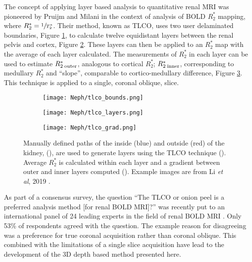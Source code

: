 The concept of applying layer based analysis to quantitative renal \ac{MRI} was pioneered by Pruijm and Milani \cite{piskunowicz_new_2015, milani_reduction_2017, pruijm_blood_2017, li_renal_2019} in the context of analysis of \ac{BOLD} $R_2^*$ mapping, where $R_2^*=\sfrac{1}{T_2^*}$. Their method, known as \ac{TLCO}, uses two user delaminated boundaries, Figure \ref{fig:ex_tlco_bounds}, to calculate twelve equidistant layers between the renal pelvis and cortex, Figure \ref{fig:ex_tlco_layers}. These layers can then be applied to an $R_2^*$ map with the average of each layer calculated. The measurements of $R_2^*$ in each layer can be used to estimate $R_{2\;\textup{outer}}^*$, analogous to cortical $R_2^*$; $R_{2\;\textup{inner}}^*$, corresponding to medullary $R_2^*$ and ``slope'', comparable to  cortico-medullary difference, Figure \ref{fig:ex_tlco_grad}. This technique is applied to a single, coronal oblique, slice.

\begin{figure}[H]
	\centering
	\begin{subfigure}[c]{0.23\textwidth}
		\centering
		\texttt{[image: Neph/tlco\_bounds.png]}
		\caption{}
		\label{fig:ex_tlco_bounds}
	\end{subfigure}
	\hfill
	\begin{subfigure}[c]{0.23\textwidth}
		\centering
		\texttt{[image: Neph/tlco\_layers.png]}
		\caption{}
		\label{fig:ex_tlco_layers}
	\end{subfigure}
	\hfill
	\begin{subfigure}[c]{0.47\textwidth}
		\centering
		\texttt{[image: Neph/tlco\_grad.png]}
		\caption{}
		\label{fig:ex_tlco_grad}
	\end{subfigure}
	\caption{Manually defined paths of the inside (blue) and outside (red) of the kidney, (), are used to generate layers using the \ac{TLCO} technique (). Average $R_2^*$ is calculated within each layer and a gradient between outer and inner layers computed (). Example images are from Li \textit{et al}, 2019 \cite{li_renal_2019}.}
	\label{fig:ex_tlco}
\end{figure}

As part of a consensus survey, the question ``The \ac{TLCO} or onion peel is a preferred analysis method [for renal \ac{BOLD} \ac{MRI}]?'' was recently put to an international panel of 24 leading experts in the field of renal \ac{BOLD} \ac{MRI} \cite{bane_consensus-based_2020}. Only 53\% of respondents agreed with the question. The example reason for disagreeing was a preference for true coronal acquisition rather than coronal oblique. This combined with the limitations of a single slice acquisition have lead to the development of the 3D depth based method presented here.

